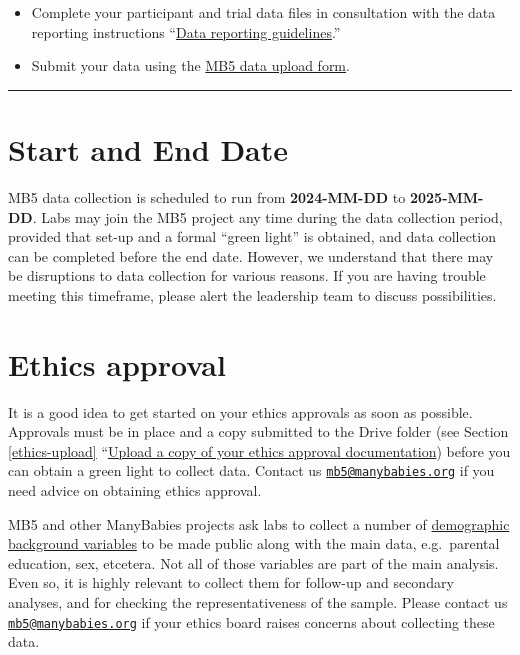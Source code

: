 \documentclass[
]{book}
\providecommand{\tightlist}{%
  \setlength{\itemsep}{0pt}\setlength{\parskip}{0pt}}
\begin{document}
\begin{itemize}
  \begin{itemize}
  \tightlist
  \item
    Complete your participant and trial data files in consultation with the data reporting instructions ``\protect\hyperlink{data-reporting-guidelines}{Data reporting guidelines}.''
  \item
    Submit your data using the \href{https://docs.google.com/forms/d/e/1FAIpQLSdFYk-gb4yjRYLjSTP1_BVaW-3vLkpJClLoY2BOGDGfIVE5ww/viewform?usp=sf_link}{MB5 data upload form}.
  \end{itemize}
\end{itemize}

\begin{center}\rule{0.5\linewidth}{0.5pt}\end{center}

\hypertarget{start-and-end-date}{%
\section{Start and End Date}\label{start-and-end-date}}

MB5 data collection is scheduled to run from \textbf{2024-MM-DD} to \textbf{2025-MM-DD}. Labs may join the MB5 project any time during the data collection period, provided that set-up and a formal ``green light'' is obtained, and data collection can be completed before the end date. However, we understand that there may be disruptions to data collection for various reasons. If you are having trouble meeting this timeframe, please alert the leadership team to discuss possibilities.

\hypertarget{ethics-approval}{%
\section{Ethics approval}\label{ethics-approval}}

It is a good idea to get started on your ethics approvals as soon as possible. Approvals must be in place and a copy submitted to the Drive folder (see Section \ref{ethics-upload} ``\protect\hyperlink{ethics-upload}{Upload a copy of your ethics approval documentation}) before you can obtain a green light to collect data. Contact us \href{mailto:mb5@manybabies.org}{\nolinkurl{mb5@manybabies.org}} if you need advice on obtaining ethics approval.

MB5 and other ManyBabies projects ask labs to collect a number of \href{ADD\%20LINK\%20TO\%20PARTICIPANTS\%20SECTION}{demographic background variables} to be made public along with the main data, e.g.~parental education, sex, etcetera. Not all of those variables are part of the main analysis. Even so, it is highly relevant to collect them for follow-up and secondary analyses, and for checking the representativeness of the sample. Please contact us \href{mailto:mb5@manybabies.org}{\nolinkurl{mb5@manybabies.org}} if your ethics board raises concerns about collecting these data.
\end{document}
